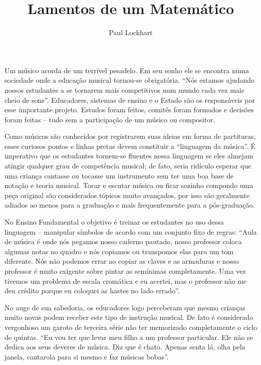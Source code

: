 \documentclass[a4paper,oneside,12pt,notitlepage]{article}
\title{Lamentos de um Matemático}
\author{Paul Lockhart}
\date{}
\begin{document}
\maketitle

Um músico acorda de um terrível pesadelo.
Em seu sonho ele se encontra numa sociedade onde a educação musical tornou-se obrigatória.
``Nós estamos ajudando nossos estudantes a se tornarem mais competitivos num mundo cada vez mais cheio de sons''.
Educadores, sistemas de ensino e o Estado são os responsáveis por esse importante projeto.
Estudos foram feitos, comitês foram formados e decisões foram feitas -- tudo sem a participação de um músico ou compositor.

Como músicos são conhecidos por registrarem suas ideias em forma de partituras, esses curiosos pontos e linhas pretas devem constituir a ``linguagem da música''.
É imperativo que os estudantes tornem-se fluentes nessa linguagem se eles almejam atingir qualquer grau de competência musical;
de fato, seria ridículo esperar que uma criança cantasse ou tocasse um instrumento sem ter uma boa base de notação e teoria musical.
Tocar e escutar música ou ficar sozinho compondo uma peça original são considerados tópicos muito avançados, por isso são geralmente adiados ao menos para a graduação e mais frequentemente para a pós-graduação.

No Ensino Fundamental o objetivo é treinar os estudantes no uso dessa linguagem -- manipular símbolos de acordo com um conjunto fixo de regras:
``Aula de música é onde nós pegamos nosso caderno pautado, nosso professor coloca algumas notas no quadro e nós copiamos ou transpomos elas para um tom diferente.
Nós não podemos errar ao copiar as claves e as armaduras e nosso professor é muito exigente sobre pintar as semínimas completamente.
Uma vez tivemos um problema de escala cromática e eu acertei, mas o professor não me deu crédito porque eu coloquei as hastes no lado errado''.

No auge de sua sabedoria, os educadores logo perceberam que mesmo crianças muito novas podem receber este tipo de instrução musical.
De fato é considerado vergonhoso um garoto de terceira série não ter memorizado completamente o ciclo de quintas.
``Eu vou ter que levar meu filho a um professor particular.
Ele não se dedica aos seus deveres de música.
Diz que é chato.
Apenas senta lá, olha pela janela, cantarola para si mesmo e faz músicas bobas''.
\end{document}

